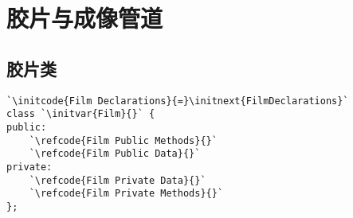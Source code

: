 \section{胶片与成像管道}\label{sec:胶片与成像管道}

\subsection{胶片类}\label{sub:胶片类}

\begin{lstlisting}
`\initcode{Film Declarations}{=}\initnext{FilmDeclarations}`
class `\initvar{Film}{}` {
public:
    `\refcode{Film Public Methods}{}`
    `\refcode{Film Public Data}{}`
private:
    `\refcode{Film Private Data}{}`
    `\refcode{Film Private Methods}{}`
};
\end{lstlisting}